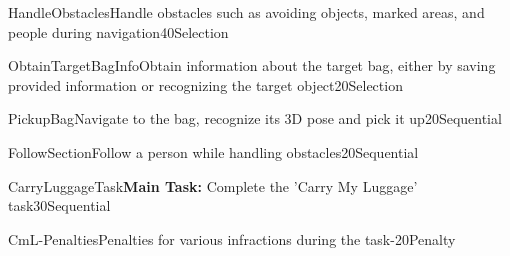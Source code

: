 
\begin{Group}{HandleObstacles}{Handle obstacles such as avoiding objects, marked areas, and people during navigation}{40}{Selection}
\end{Group}

\begin{Group}{ObtainTargetBagInfo}{Obtain information about the target bag, either by saving provided information or recognizing the target object}{20}{Selection}
\end{Group}


\begin{Group}{PickupBag}{Navigate to the bag, recognize its 3D pose and pick it up}{20}{Sequential}
\end{Group}


\begin{Group}{FollowSection}{Follow a person while handling obstacles}{20}{Sequential}
\end{Group}

\begin{Group}{CarryLuggageTask}{\textbf{\textcolor{myturquoise}{Main Task:}} Complete the 'Carry My Luggage' task}{30}{Sequential}
\end{Group}


\begin{Group}{CmL-Penalties}{Penalties for various infractions during the task}{-20}{Penalty}
\end{Group}
